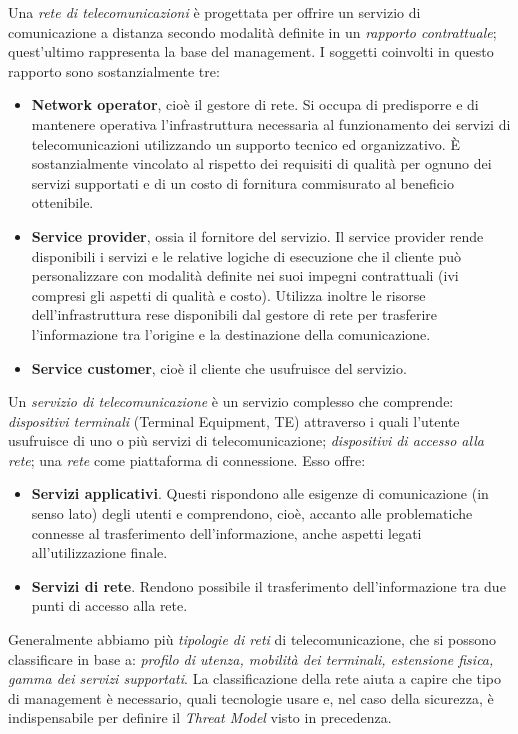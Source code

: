 Una \textit{rete di telecomunicazioni} è progettata per offrire un servizio di comunicazione a distanza secondo modalità definite in un \textit{rapporto contrattuale}; quest'ultimo rappresenta la base del management. I soggetti coinvolti in questo rapporto sono sostanzialmente tre:
\begin{itemize}
	\item \textbf{Network operator}, cioè il gestore di rete. Si occupa di predisporre e di mantenere operativa l'infrastruttura necessaria al funzionamento dei servizi di telecomunicazioni utilizzando un supporto tecnico ed organizzativo. È sostanzialmente vincolato al rispetto dei requisiti di qualità per ognuno dei servizi supportati e di un costo di fornitura commisurato al beneficio ottenibile.
	\item \textbf{Service provider}, ossia il fornitore del servizio. Il service provider rende disponibili i servizi e le relative logiche di esecuzione che il cliente può personalizzare con modalità definite nei suoi impegni contrattuali (ivi compresi gli aspetti di qualità e costo). Utilizza inoltre le risorse dell'infrastruttura rese disponibili dal gestore di rete per trasferire l'informazione tra l'origine e la destinazione della comunicazione.
	\item \textbf{Service customer}, cioè il cliente che usufruisce del servizio.
\end{itemize}
Un \textit{servizio di telecomunicazione} è un servizio complesso che comprende: \textit{dispositivi terminali} (Terminal Equipment, TE) attraverso i quali l'utente usufruisce di uno o più servizi di telecomunicazione; \textit{dispositivi di accesso alla rete}; una \textit{rete} come piattaforma di connessione. Esso offre:
\begin{itemize}
	\item \textbf{Servizi applicativi}. Questi rispondono alle esigenze di comunicazione (in senso lato) degli utenti e comprendono, cioè, accanto alle problematiche connesse al trasferimento dell'informazione, anche aspetti legati all'utilizzazione finale.
	\item \textbf{Servizi di rete}. Rendono possibile il trasferimento dell'informazione tra due punti di accesso alla rete.
\end{itemize}
Generalmente abbiamo più \textit{tipologie di reti} di telecomunicazione, che si possono classificare in base a: \textit{profilo di utenza, mobilità dei terminali, estensione fisica, gamma dei servizi supportati}. La classificazione della rete aiuta a capire che tipo di management è necessario, quali tecnologie usare e, nel caso della sicurezza, è indispensabile per definire il \textit{Threat Model} visto in precedenza.

